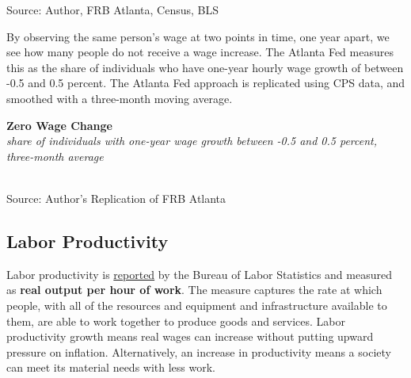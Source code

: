 \documentclass{report}
\makeatletter
\newcommand{\tbllink}[1]{\href{https://raw.githubusercontent.com/bdecon/US-chartbook/master/chartbook/data/#1}{\faTable}}
\newcommand*\short[1]{\expandafter\@gobbletwo\number\numexpr#1\relax}
\newcommand{\dateaxisticks}{
		date coordinates in=x, axis line style={draw=none},
		xmax={2023-11-01},
		max space between ticks=40,	    
		xtick={{1990-01-01}, {1992-01-01}, {1994-01-01}, 
			{1996-01-01}, {1998-01-01}, {2000-01-01}, 
			{2002-01-01}, {2004-01-01}, {2006-01-01},
			{2008-01-01}, {2010-01-01}, {2012-01-01}, {2014-01-01},
		    {2016-01-01}, {2018-01-01}, {2020-01-01}, {2022-01-01}, 
		    {2024-01-01}, {2026-01-01}},
		minor xtick={{1989-01-01}, {1991-01-01}, {1993-01-01},
			{1995-01-01}, {1997-01-01}, {1999-01-01}, 
			{2001-01-01}, {2003-01-01}, {2005-01-01}, {2007-01-01},
		    {2009-01-01}, {2011-01-01}, {2013-01-01}, {2015-01-01},
		    {2017-01-01}, {2019-01-01}, {2021-01-01}, {2023-01-01}, 
		    {2025-01-01}, {2027-01-01}},
		enlarge y limits={0.06}, enlarge x limits={0.01},
		}
\newcommand{\bbar}[2]{extra #1 ticks = {{#2}}, extra #1 tick labels = ,
		extra #1 tick style = {grid=major, grid style={thick, black!25}},}
\newcommand{\stdline}[4]{\addplot[very thick, no markers, color=#1] 
		table [x=#2, y=#3, col sep=comma] {#4};	}
\newcommand{\rebars}{
		\fill[color=black!10] (axis cs:{2007-12-01},\pgfkeysvalueof{/pgfplots/ymin}) rectangle 
			(axis cs:{2009-07-01}, \pgfkeysvalueof{/pgfplots/ymax});
		\fill[color=black!10] (axis cs:{2001-03-01},\pgfkeysvalueof{/pgfplots/ymin}) rectangle 
			(axis cs:{2001-11-01}, \pgfkeysvalueof{/pgfplots/ymax});
		\fill[color=black!10] (axis cs:{2020-02-01},\pgfkeysvalueof{/pgfplots/ymin}) rectangle 
			(axis cs:{2020-05-01}, \pgfkeysvalueof{/pgfplots/ymax});}
\makeatother
\begin{document}
{\begin{minipage}{0.76\textwidth}
\footnotesize{Source: Author, FRB Atlanta, Census, BLS} \hfill \tbllink{atl_wgt.csv}
\vspace{3mm}

\small By observing the same person's wage at two points in time, one year apart, we see how many people do not receive a wage increase. The Atlanta Fed measures this as the share of individuals who have one-year hourly wage growth of between -0.5 and 0.5 percent. The Atlanta Fed approach is replicated using CPS data, and smoothed with a three-month moving average. 


\vspace{1mm}

\normalsize \textbf{Zero Wage Change}\\
\footnotesize{\textit{share of individuals with one-year wage growth between -0.5 and 0.5 percent, three-month average}}\\
\hspace*{-1mm} \\
\footnotesize{Source: Author's Replication of FRB Atlanta} \hfill \tbllink{atl_wgt.csv}
\end{minipage}
\newpage
\vspace*{-10mm}

\begin{minipage}{0.76\textwidth}
\subsection*{Labor Productivity}
\hypertarget{labprod}{\label{labprod}}
\small Labor productivity is \href{https://www.bls.gov/news.release/prod2.nr0.htm}{reported} by the Bureau of Labor Statistics and measured as \textbf{real output per hour of work}. The measure captures the rate at which people, with all of the resources and equipment and infrastructure available to them, are able to work together to produce goods and services. Labor productivity growth means real wages can increase without putting upward pressure on inflation. Alternatively, an increase in productivity means a society can meet its material needs with less work.
\end{minipage}

}
\end{document}
